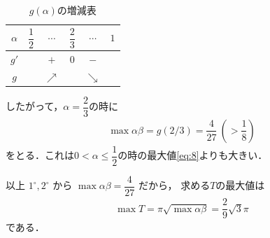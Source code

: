 \documentclass[../../main.tex]{subfiles}
\begin{document}
\begin{table}[htb]
  \centering
  \caption{$g(\alpha)$の増減表}
  \begin{tabular}{|c|c|c|c|c|c|}
    \hline
    $\alpha$ & $\dfrac{1}{2}$ & $\cdots$ & $\dfrac{2}{3}$ & $\cdots$ & $1$ \\
    \hline
    $g'$ & & $+$ & $0$ & $-$ & \\
    \hline
    $g$ & & $\nearrow$ & & $\searrow$ & \\
    \hline
  \end{tabular}
\end{table}

したがって，$\alpha=\dfrac{2}{3}$の時に
\begin{align}
  \max \alpha\beta = g(2/3) = \dfrac{4}{27} \ (> \dfrac{1}{8})
\end{align}
をとる．これは$0 < \alpha \le \dfrac{1}{2}$の時の最大値\cref{eq:8}よりも大きい．
\casesend

以上 $1^\circ, 2^\circ$ から $\max \alpha\beta = \dfrac{4}{27}$ だから，
求める$T$の最大値は
\begin{align}
  \max T
  = \pi\sqrt{\max \alpha\beta}
  = \dfrac{2}{9} \sqrt{3} \pi
\end{align}
である．
\end{document}
